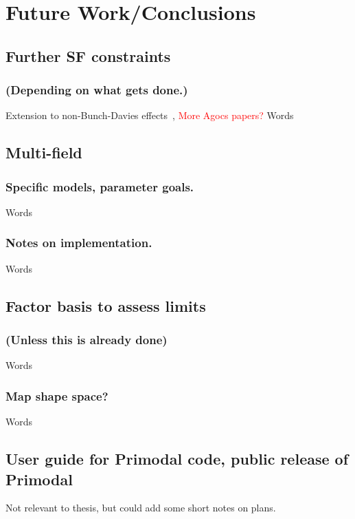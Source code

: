 \chapter{Future Work/Conclusions}\label{chapter:conclusion}
\section{Further SF constraints}
    \subsection{(Depending on what gets done.)}
    Extension to non-Bunch-Davies effects~\cite{RKWKB},
    \textcolor{red}{More Agocs papers?}
    Words
\section{Multi-field}
    \subsection{Specific models, parameter goals.}
    Words
    \subsection{Notes on implementation.}
    Words
\section{Factor basis to assess limits}
    \subsection{(Unless this is already done)}
    Words
    \subsection{Map shape space?}
    Words
\section{User guide for Primodal code, public release of Primodal}
    Not relevant to thesis, but could add some short notes on plans.

